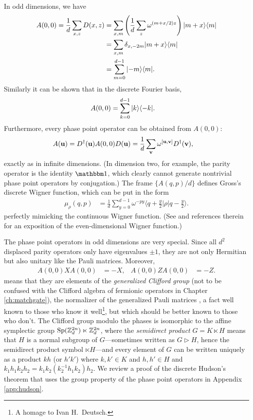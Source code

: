 In odd dimensions, we have
\begin{align}
	A(0,0) = \frac{1}{d} \sum_{x,z} D(x,z)
		&= \sum_{x,m} \left( \frac{1}{d} \sum_z \omega^{(m+x/2)z} \right) {\left\vert{m+x}\right\rangle}{\left\langle{m}\right\vert} \nonumber \\
		&= \sum_{x,m} \delta_{x,-2m} {\left\vert{m+x}\right\rangle}{\left\langle{m}\right\vert} \nonumber  \\
		&= \sum_{m=0}^{d-1} {\left\vert{-m}\right\rangle}{\left\langle{m}\right\vert}.
\end{align}
Similarly it can be shown that in the discrete Fourier basis,
\begin{align}
	A(0,0) &= \sum_{k=0}^{d-1} {\left\vert{k}\right\rangle}{\left\langle{-k}\right\vert}.
\end{align}
Furthermore, every phase point operator can be obtained from $A(0,0)$:
\begin{align}
A({\bf u}) &= D^{\dagger}({\bf u}) A(0,0) D({\bf u})
= \frac{1}{d} \sum_{\bf v} \omega^{[{\bf u}, {\bf v}]} D^{\dagger}({\bf v}), \label{wigner-covariance}
\end{align}
exactly as in infinite dimensions. (In dimension two, for example, the parity operator is the identity $\id$, which clearly cannot generate nontrivial phase point operators by conjugation.) The frame $\{A(q,p)/d\}$ defines Gross's discrete Wigner function, which can be put in the form \cite{gross_hudsons_2006,gross_non-negative_2007}
\begin{align}\label{ch4:gross-wigner-function}
\mu_{\rho}(q,p) &= \frac{1}{d} \sum_{y=0}^{d-1} \omega^{-py} \bigg\langle q+\frac{y}{2} \bigg| \rho \bigg|q-\frac{y}{2}\bigg\rangle.
\end{align}
perfectly mimicking the continuous Wigner function. (See \cite{miquel_quantum_2002} and references therein for an exposition of the even-dimensional Wigner function.)

The phase point operators in odd dimensions are very special. Since all $d^2$ displaced parity operators only have eigenvalues $\pm 1$, they are not only Hermitian but also unitary like the Pauli matrices. Moreover,
\begin{align}
A(0,0)XA(0,0) &= -X, & A(0,0)ZA(0,0) &= -Z.
\end{align}
means that they are elements of the \emph{generalized Clifford group} (not to be confused with the Clifford algebra of fermionic operators in Chapter \ref{ch:matchgate}),
the normalizer of the generalized Pauli matrices \cite{zhu_permutation_2016,bengtsson_discrete_2017}, a fact well known to those who know it well\footnote{A homage to Ivan H.~Deutsch.}, but which should be better known to those who don't. The Clifford group modulo the phases is isomorphic to the affine symplectic group $\text{Sp}(\mathbb{Z}_d^{2n}) \ltimes \mathbb{Z}_d^{2n}$, where the \emph{semidirect product} $G = K \ltimes H$ means that $H$ is a normal subgroup of $G$---sometimes written as $G \triangleright H$, hence the semidirect product symbol $\ltimes H$---and every element of $G$ can be written uniquely as a product $kh$ (or $h'k'$) where $k,k' \in K$ and $h,h' \in H$ and $k_1h_1k_2h_2 = k_1k_2 (k_2^{-1}h_1k_2)h_2$.
We review a proof of the discrete Hudson's theorem that uses the group property of the phase point operators in Appendix \ref{app:hudson}.

